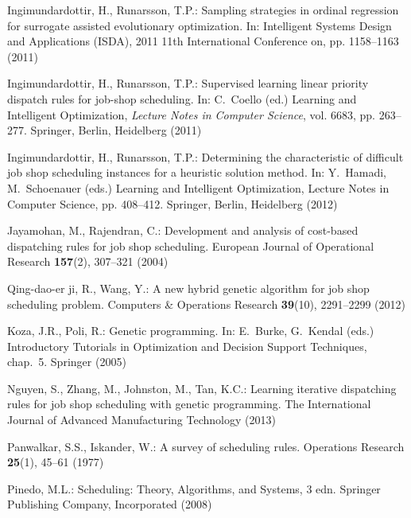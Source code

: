 \documentclass[graybox]{svmult}
\begin{document}
\begin{thebibliography}{10}
    Ingimundardottir, H., Runarsson, T.P.: Sampling strategies in ordinal
    regression for surrogate assisted evolutionary optimization.
    \newblock In: Intelligent Systems Design and Applications (ISDA), 2011 11th
    International Conference on, pp. 1158--1163 (2011)
    
    Ingimundardottir, H., Runarsson, T.P.: Supervised learning linear priority
    dispatch rules for job-shop scheduling.
    \newblock In: C.~Coello (ed.) Learning and Intelligent Optimization,
    \emph{Lecture Notes in Computer Science}, vol. 6683, pp. 263--277. Springer,
    Berlin, Heidelberg (2011)
    
    Ingimundardottir, H., Runarsson, T.P.: Determining the characteristic of
    difficult job shop scheduling instances for a heuristic solution method.
    \newblock In: Y.~Hamadi, M.~Schoenauer (eds.) Learning and Intelligent
    Optimization, Lecture Notes in Computer Science, pp. 408--412. Springer,
    Berlin, Heidelberg (2012)
    
    Jayamohan, M., Rajendran, C.: Development and analysis of cost-based
    dispatching rules for job shop scheduling.
    \newblock European Journal of Operational Research \textbf{157}(2), 307--321
    (2004)
    
    Qing-dao-er ji, R., Wang, Y.: {A new hybrid genetic algorithm for job shop  
    scheduling problem}.
    \newblock Computers \& Operations Research \textbf{39}(10), 2291--2299 
    (2012)
    
    Koza, J.R., Poli, R.: {Genetic programming}.
    \newblock In: E.~Burke, G.~Kendal (eds.) Introductory Tutorials in 
    Optimization and Decision Support Techniques, chap.~5. Springer (2005)
    
    Nguyen, S., Zhang, M., Johnston, M., Tan, K.C.: {Learning iterative  
    dispatching rules for job shop scheduling with genetic programming}.
    \newblock The International Journal of Advanced Manufacturing Technology
    (2013)
    
    Panwalkar, S.S., Iskander, W.: A survey of scheduling rules.
    \newblock Operations Research \textbf{25}(1), 45--61 (1977)
    
    Pinedo, M.L.: Scheduling: Theory, Algorithms, and Systems, 3 edn.
    \newblock Springer Publishing Company, Incorporated (2008)
    

\end{thebibliography}
\end{document}
